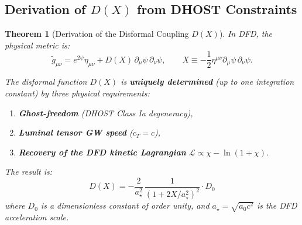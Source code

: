 \documentclass[11pt,a4paper]{article}
\newtheorem{theorem}{Theorem}
\begin{document}
\subsection{Derivation of $D(X)$ from DHOST Constraints}

\begin{theorem}[Derivation of the Disformal Coupling $D(X)$]
\label{thm:disformal-derivation}
In DFD, the physical metric is:
\begin{equation}
\tilde{g}_{\mu\nu} = e^{2\psi}\eta_{\mu\nu} + D(X)\,\partial_\mu\psi\,\partial_\nu\psi, \qquad X \equiv -\frac{1}{2}\eta^{\mu\nu}\partial_\mu\psi\,\partial_\nu\psi.
\end{equation}

The disformal function $D(X)$ is \textbf{uniquely determined} (up to one integration constant) by three physical requirements:
\begin{enumerate}
\item \textbf{Ghost-freedom} (DHOST Class Ia degeneracy),
\item \textbf{Luminal tensor GW speed} ($c_T = c$),
\item \textbf{Recovery of the DFD kinetic Lagrangian} $\mathcal{L} \propto \chi - \ln(1+\chi)$.
\end{enumerate}

The result is:
\begin{equation}\label{eq:D-derived}
\boxed{D(X) = -\frac{2}{a_\star^2}\,\frac{1}{(1+2X/a_\star^2)^2}\cdot D_0}
\end{equation}
where $D_0$ is a dimensionless constant of order unity, and $a_\star = \sqrt{a_0 c^2}$ is the DFD acceleration scale.
\end{theorem}
\end{document}
